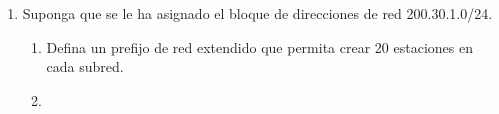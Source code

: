 \begin{enumerate}
    \item Suponga que se le ha asignado el bloque de direcciones de red 200.30.1.0/24.
    \begin{enumerate}
        \item Defina un prefijo de red extendido que permita crear 20 estaciones en cada subred.
        \item 
    \end{enumerate}
\end{enumerate}